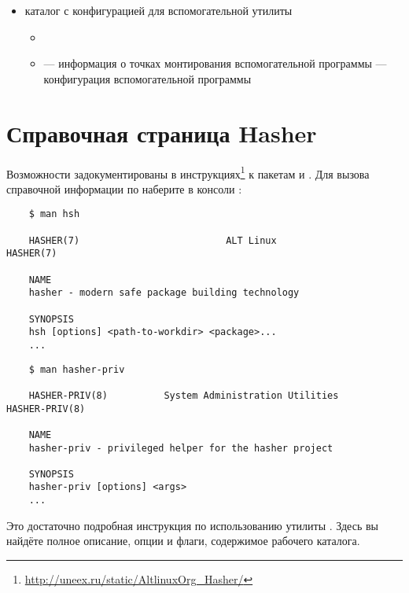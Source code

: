 \begin{itemize}
	\item {} каталог с конфигурацией для вспомогательной утилиты 
	\begin{itemize}
		\item {}
		\item {} --- информация о точках монтирования вспомогательной программы 
		 --- конфигурация вспомогательной программы 
	\end{itemize} 
\end{itemize} 


\section{Справочная страница Hasher}
Возможности  задокументированы в инструкциях\footnote{\href{http://uneex.ru/static/AltlinuxOrg_Hasher/}{http://uneex.ru/static/AltlinuxOrg\_Hasher/}} к пакетам  и . Для вызова справочной информации по  наберите в консоли :
\begin{verbatim}
	$ man hsh
	
	HASHER(7)                          ALT Linux                         HASHER(7)
	
	NAME
	hasher - modern safe package building technology
	
	SYNOPSIS
	hsh [options] <path-to-workdir> <package>...
	...
\end{verbatim} 

\begin{verbatim}
	$ man hasher-priv
	
	HASHER-PRIV(8)          System Administration Utilities         HASHER-PRIV(8)
	
	NAME
	hasher-priv - privileged helper for the hasher project
	
	SYNOPSIS
	hasher-priv [options] <args>
	...
\end{verbatim}

Это достаточно подробная инструкция по использованию утилиты . Здесь вы найдёте полное описание, опции и флаги, содержимое рабочего каталога. 



